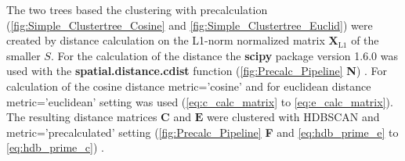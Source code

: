 The two trees based the clustering with precalculation (\autoref{fig:Simple_Clustertree_Cosine} and \autoref{fig:Simple_Clustertree_Euclid}) were created by distance calculation on the L1-norm normalized matrix $\mathbf{X}_{\text{L1}}$ of the smaller $S$. For the calculation of the distance the \textbf{scipy} package version 1.6.0 was used with the \textbf{spatial.distance.cdist} function (\autoref{fig:Precalc_Pipeline} \textsf{\textbf{N}}) \autocite{scipy_10_contributors_scipy_2020}. For calculation of the cosine distance \colorbox{backcolour}{metric='cosine'} and for euclidean distance \colorbox{backcolour}{metric='euclidean'} setting was used (\autoref{eq:c_calc_matrix} to \autoref{eq:e_calc_matrix}). The resulting distance matrices $\mathbf{C}$ and $\mathbf{E}$ were clustered with \gls{HDBSCAN} and \colorbox{backcolour}{metric='precalculated'} setting (\autoref{fig:Precalc_Pipeline} \textsf{\textbf{F}} and \autoref{eq:hdb_prime_e} to \autoref{eq:hdb_prime_c}) \autocite{mcinnes_hdbscan_2017}.





